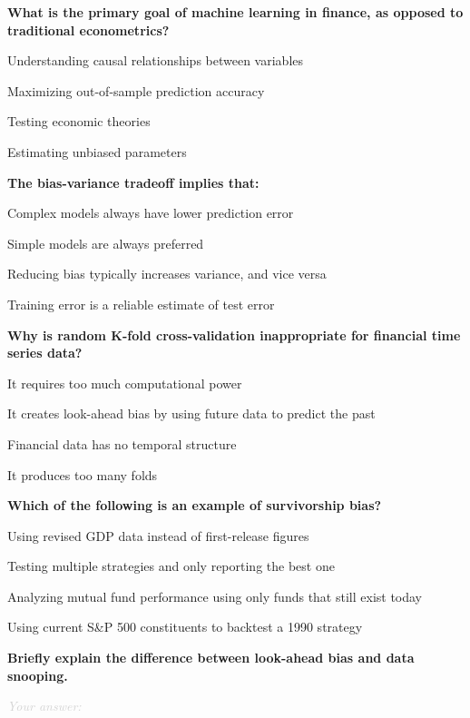 \documentclass[11pt]{article}
\newcommand{\shortanswer}{%
  \vspace{0.3em}
  \textcolor{LightGray}{\textit{Your answer:} \hrulefill}
  \vspace{0.5em}
}
\begin{document}
\begin{questions}

\item \textbf{What is the primary goal of machine learning in finance, as opposed to traditional econometrics?}
\begin{options}
  \item Understanding causal relationships between variables
  \item Maximizing out-of-sample prediction accuracy
  \item Testing economic theories
  \item Estimating unbiased parameters
\end{options}

\item \textbf{The bias-variance tradeoff implies that:}
\begin{options}
  \item Complex models always have lower prediction error
  \item Simple models are always preferred
  \item Reducing bias typically increases variance, and vice versa
  \item Training error is a reliable estimate of test error
\end{options}

\item \textbf{Why is random K-fold cross-validation inappropriate for financial time series data?}
\begin{options}
  \item It requires too much computational power
  \item It creates look-ahead bias by using future data to predict the past
  \item Financial data has no temporal structure
  \item It produces too many folds
\end{options}

\item \textbf{Which of the following is an example of survivorship bias?}
\begin{options}
  \item Using revised GDP data instead of first-release figures
  \item Testing multiple strategies and only reporting the best one
  \item Analyzing mutual fund performance using only funds that still exist today
  \item Using current S\&P 500 constituents to backtest a 1990 strategy
\end{options}

\item \textbf{Briefly explain the difference between look-ahead bias and data snooping.}

\shortanswer

\end{questions}
\end{document}
